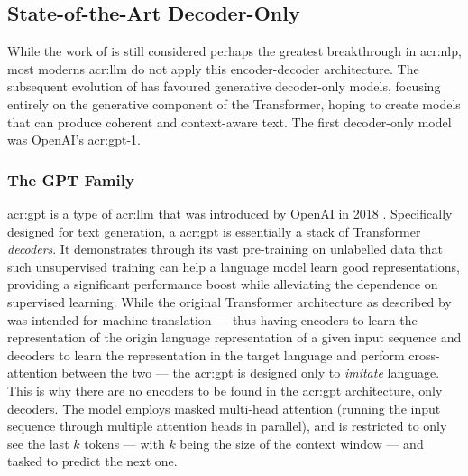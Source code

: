 \subsection[State-of-the-Art Decoder-Only Models]{State-of-the-Art Decoder-Only }
\label{subsec:sota-decoder-only-llms}

While the work of \citeauthor{vaswaniAttentionAllYou2017} is still considered perhaps the greatest breakthrough in \gls{acr:nlp}, most moderns \acrshort{acr:llm} do not apply this encoder-decoder architecture. The subsequent evolution of  has favoured generative decoder-only models, focusing entirely on the generative component of the Transformer, hoping to create models that can produce coherent and context-aware text. The first decoder-only model was OpenAI's \acrshort{acr:gpt}-1.

\subsubsection{The GPT Family}
\label{subusubsec:gpt}

\gls{acr:gpt} is a type of \gls{acr:llm} that was introduced by OpenAI in 2018 \citep{radfordImprovingLanguageUnderstanding2018}. Specifically designed for text generation, a \acrshort{acr:gpt} is essentially a stack of Transformer \textit{decoders}. It demonstrates through its vast pre-training on unlabelled data that such unsupervised training can help a language model learn good representations, providing a significant performance boost while alleviating the dependence on supervised learning. While the original Transformer architecture as described by \cite{vaswaniAttentionAllYou2017} was intended for machine translation --- thus having encoders to learn the representation of the origin language representation of a given input sequence and decoders to learn the representation in the target language and perform cross-attention between the two --- the \acrshort{acr:gpt} is designed only to \textit{imitate} language. This is why there are no encoders to be found in the \acrshort{acr:gpt} architecture, only decoders. The model employs masked multi-head attention (running the input sequence through multiple attention heads in parallel), and is restricted to only see the last $k$ tokens --- with $k$ being the size of the context window --- and tasked to predict the next one.

